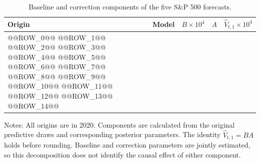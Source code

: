 \begin{table}[p]
\centering
\begin{threeparttable}
\caption{Baseline and correction components of the five S\&P 500 forecasts.}
\label{tab:sp500-baseline-decomposition}
\small
\setlength{\tabcolsep}{4pt}
\begin{tabular*}{\textwidth}{@{\extracolsep{\fill}}llrrr@{}}
\toprule
Origin & Model & $B\times10^4$ & $A$ & $\widehat V_{t,1}\times10^4$ \\
\midrule
@@ROW_0@@
@@ROW_1@@
@@ROW_2@@
\addlinespace
@@ROW_3@@
@@ROW_4@@
@@ROW_5@@
\addlinespace
@@ROW_6@@
@@ROW_7@@
@@ROW_8@@
\addlinespace
@@ROW_9@@
@@ROW_10@@
@@ROW_11@@
\addlinespace
@@ROW_12@@
@@ROW_13@@
@@ROW_14@@
\bottomrule
\end{tabular*}
\begin{tablenotes}[flushleft]
\footnotesize
\item Notes: All origins are in 2020. Components are calculated from the original predictive draws and corresponding posterior parameters. The identity $\widehat V_{t,1}=BA$ holds before rounding. Baseline and correction parameters are jointly estimated, so this decomposition does not identify the causal effect of either component.
\end{tablenotes}
\end{threeparttable}
\end{table}
